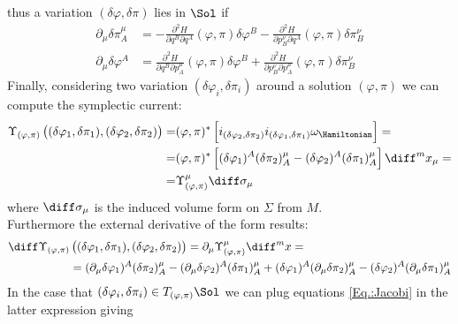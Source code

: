 \documentclass[a4paper,12pt]{scrartcl}  %
\begin{document}
thus a variation $(\delta \varphi, \delta \pi)$ lies in $\Sol$ if
\begin{align}\label{Eq.:Jacobi}
	\partial_\mu \delta \pi^\mu_A &=
	- \frac{\partial^2 H}{\partial q^B \partial q^A} (\varphi, \pi) \delta \varphi^B
	- \frac{\partial^2 H}{\partial p^\nu_B \partial q^A} (\varphi, \pi) \delta \pi^\nu_B \\
		\partial_\mu \delta \varphi^A &=
		\frac{\partial^2 H}{\partial q^B \partial p^\mu_A} (\varphi, \pi) \delta \varphi^B +
		\frac{\partial^2 H}{\partial p^\nu_B \partial p^\mu_A}(\varphi, \pi) \delta \pi^\nu_B
\end{align}
%
Finally, considering two variation $(\delta \varphi_i, \delta \pi_i)$ around a solution $(\varphi,\pi)$ we can compute the symplectic current:
\begin{align*}
	\Upsilon_{(\varphi,\pi)} \left( (\delta \varphi_1, \delta \pi_1) , (\delta \varphi_2, \delta \pi_2) \right) = &
	(\varphi, \pi)^\ast \left[ i_{( \delta \varphi_2, \delta \pi_2)} i_{( \delta \varphi_1, \delta \pi_1)} \omega_\Hamiltonian \right] = \\
	= & (\varphi, \pi)^\ast	\left[ (\delta \varphi_1)^A (\delta \pi_2)^\mu_A - (\delta \varphi_2)^A (\delta \pi_1)^\mu_A \right]	\diff^m x_\mu = \\
	= & \Upsilon_{(\varphi,\pi)}^\mu \diff \sigma_\mu
\end{align*}
where $\diff \sigma_\mu $ is the induced volume form on $\Sigma$ from $M$.\\
Furthermore the external derivative of the form results:
\begin{align*}
	\diff \Upsilon_{(\varphi,\pi)} &\left( (\delta \varphi_1, \delta \pi_1) , (\delta \varphi_2, \delta \pi_2) \right)  =
	\partial_\mu \Upsilon_{(\varphi,\pi)}^\mu \diff^mx = \\
	& = (\partial_\mu \delta \varphi_1)^A (\delta \pi_2)^\mu_A - (\partial_\mu \delta \varphi_2)^A (\delta \pi_1)^\mu_A + 
	(\delta \varphi_1)^A (\partial_\mu  \delta \pi_2)^\mu_A - (\delta \varphi_2)^A (\partial_\mu  \delta \pi_1)^\mu_A
\end{align*}
In the case that $(\delta \varphi_i, \delta \pi_i) \in T_{(\varphi,\pi)}\Sol$ we can plug equations \ref{Eq.:Jacobi} in the latter expression giving
\end{document}
